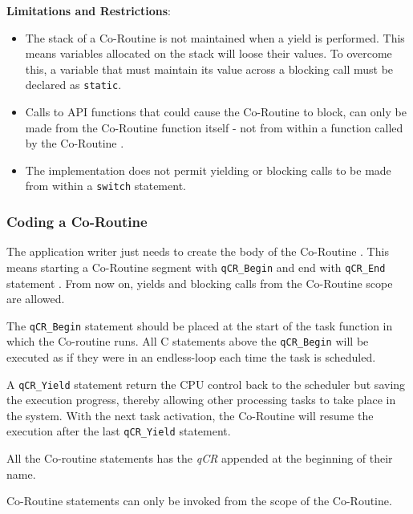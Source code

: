 \textbf{Limitations and Restrictions}:

\begin{itemize}
    \item The stack of a Co-Routine  is not maintained when a yield is performed. This means variables allocated on the stack will loose their values. To overcome this, a variable that must maintain its value across a blocking call must be declared as \lstinline{static}.
    \item Calls to API functions that could cause the Co-Routine to block, can only be made from the Co-Routine  function itself - not from within a function called by the Co-Routine .
    \item The implementation does not permit yielding or blocking calls to be made from within a \lstinline{switch} statement.
\end{itemize}

\subsubsection{Coding a Co-Routine}
The application writer just needs to create the body of the Co-Routine . This means starting a Co-Routine segment with \lstinline{qCR_Begin}  and end with \lstinline{qCR_End} statement . From now on, yields and blocking calls from the Co-Routine scope are allowed.
\medskip

  

The \lstinline{qCR_Begin} statement should be placed at the start of the task function in which the Co-routine runs. All C statements above the \lstinline{qCR_Begin} will be executed as if they were in an endless-loop each time the task is scheduled.

A \lstinline{qCR_Yield}  statement return the CPU control back to the scheduler but saving the execution progress, thereby allowing other processing tasks to take place in the system. With the next task activation, the Co-Routine will resume the execution after the last \lstinline{qCR_Yield} statement.
\medskip

\begin{tcolorbox}
\HandRight All the Co-routine statements has the \textit{qCR} appended at the beginning of their name.
\end{tcolorbox}

\begin{tcolorbox}
\HandRight Co-Routine statements can only be invoked from the scope of the Co-Routine.
\end{tcolorbox}


